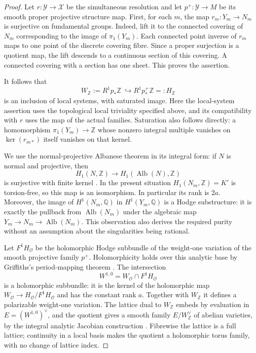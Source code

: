 \begin{proof}
Let $r:\mathcal Y\to\mathcal X$ be the simultaneous resolution and
let $p^+:\mathcal Y\to M$ be its smooth proper projective structure
map.  First, for each $m$, the map $r_m:Y_m\to N_m$ is surjective on
fundamental groups.  Indeed, lift it to the connected covering of
$N_m$ corresponding to the image of $\pi_1(Y_m)$.  Each connected
point inverse of $r_m$ maps to one point of the discrete covering
fibre.  Since a proper surjection is a quotient map, the lift descends
to a continuous section of this covering.  A connected covering with
a section has one sheet.  This proves the assertion.

It follows that
\begin{equation}
 W_{\mathbb Z}:=R^1p_*\mathbb Z\ \hookrightarrow
                         R^1p^+_*\mathbb Z=:H_{\mathbb Z}
 \label{cmp:cohomology-inclusion}
\end{equation}
is an inclusion of local systems, with saturated image.  Here the
local-system assertion uses the topological local triviality specified
above, and its compatibility with $r$ uses the map of the actual
families.  Saturation also follows directly: a homomorphism
$\pi_1(Y_m)\to\mathbb Z$ whose nonzero integral multiple vanishes on
$\ker(r_{m*})$ itself vanishes on that kernel.

We use the normal-projective Albanese theorem in its integral form:
if $N$ is normal and projective, then
\[
 H_1(N,\mathbb Z)\longrightarrow H_1(\operatorname{Alb}(N),\mathbb Z)
\]
is surjective with finite kernel
\cite[Lemma~4.7]{ClaudonHoeringKollar2013}.  In the present situation
$H_1(N_m,\mathbb Z)=K'$ is torsion-free, so this map is an isomorphism.
In particular its rank is $2a$.  Moreover, the image of
$H^1(N_m,\mathbb Q)$ in $H^1(Y_m,\mathbb Q)$ is a Hodge substructure:
it is exactly the pullback from $\operatorname{Alb}(N_m)$ under the
algebraic map $Y_m\to N_m\to\operatorname{Alb}(N_m)$.  This observation
also derives the required purity without an assumption about the
singularities being rational.

Let $F^1H_{\mathcal O}$ be the holomorphic Hodge subbundle of the
weight-one variation of the smooth projective family $p^+$.
Holomorphicity holds over this analytic base by Griffiths's
period-mapping theorem \cite[II, Theorem~(1.1)]{Griffiths1968}.  The
intersection
\[
                    W^{1,0}=W_{\mathcal O}\cap F^1H_{\mathcal O}
\]
is a holomorphic subbundle: it is the kernel of the holomorphic map
$W_{\mathcal O}\to H_{\mathcal O}/F^1H_{\mathcal O}$ and has the
constant rank $a$.  Together with $W_{\mathbb Z}$ it defines a
polarizable weight-one variation.  The lattice dual to $W_{\mathbb Z}$
embeds by evaluation in
$E=(W^{1,0})^\vee$, and the quotient gives a smooth family $E/W_{\mathbb Z}^\vee$
of abelian varieties, by the integral analytic Jacobian construction
\cite[\S2.1]{Claudon2018}. Fibrewise the lattice is a full lattice;
continuity in a local basis makes the quotient a holomorphic torus
family, with no change of lattice index.


\end{proof}

